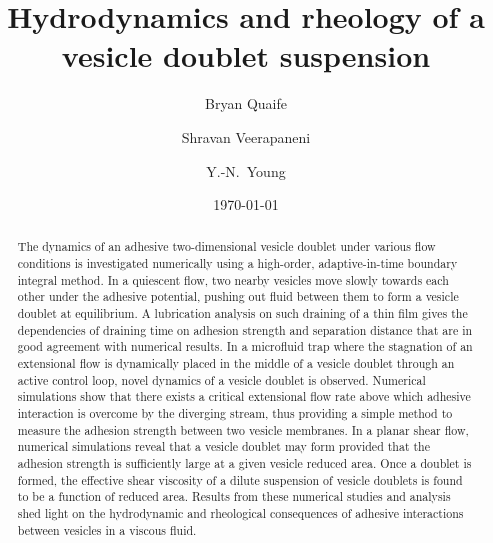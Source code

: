 \documentclass[prf,superscriptaddress,showkeys]{revtex4-1}
\begin{document}

\title{Hydrodynamics and rheology of a vesicle doublet suspension}

\author{Bryan Quaife}
\author{Shravan Veerapaneni}%
%
\author{Y.-N.~Young}%
%

\date{\today}%

\begin{abstract}
The dynamics of an adhesive two-dimensional vesicle doublet under
various flow conditions is investigated numerically using a high-order,
adaptive-in-time boundary integral method. In a quiescent flow, two
nearby vesicles move slowly towards each other under the adhesive
potential, pushing out fluid between them to form a vesicle doublet at
equilibrium. A lubrication analysis on such draining of a thin film
gives the dependencies of draining time on adhesion strength and
separation distance that are in good agreement with numerical results.
%
In a microfluid trap where the stagnation of an extensional flow is
dynamically placed in the middle of a vesicle doublet through an active
control loop, novel dynamics of a vesicle doublet is observed. Numerical
simulations show that there exists a critical extensional flow rate
above which adhesive interaction is overcome by the diverging stream,
thus providing a simple method to measure the adhesion strength between
two vesicle membranes. 
%
In a planar shear flow, numerical simulations reveal that a vesicle
doublet may form provided that the adhesion strength is sufficiently
large at a given vesicle reduced area. Once a doublet is formed, the
effective shear viscosity of a dilute suspension of vesicle doublets is
found to be a function of  reduced area.  Results from these numerical
studies and analysis shed light on the hydrodynamic and rheological
consequences of adhesive interactions between vesicles in a viscous
fluid.
\end{abstract}
\end{document}
